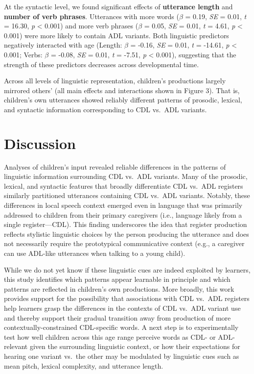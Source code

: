 \documentclass[10pt, letterpaper]{article}
\begin{document}
At the syntactic level, we found significant effects of
\textbf{utterance length} and \textbf{number of verb phrases}.
Utterances with more words (\(\beta\) = 0.19, \emph{SE} = 0.01, \emph{t}
= 16.30, \emph{p} \textless{} 0.001) and more verb phrases (\(\beta\) =
0.05, \emph{SE} = 0.01, \emph{t} = 4.61, \emph{p} \textless{} 0.001)
were more likely to contain ADL variants. Both linguistic predictors
negatively interacted with age (Length: \(\beta\) = -0.16, \emph{SE} =
0.01, \emph{t} = -14.61, \emph{p} \textless{} 0.001; Verbs: \(\beta\) =
-0.08, \emph{SE} = 0.01, \emph{t} = -7.51, \emph{p} \textless{} 0.001),
suggesting that the strength of these predictors decreases across
developmental time.

Across all levels of linguistic representation, children's productions
largely mirrored others' (all main effects and interactions shown in
Figure 3). That is, children's own utterances showed reliably different
patterns of prosodic, lexical, and syntactic information corresponding
to CDL vs.~ADL variants.

\hypertarget{discussion-1}{%
\section{Discussion}\label{discussion-1}}

Analyses of children's input revealed reliable differences in the
patterns of linguistic information surrounding CDL vs.~ADL variants.
Many of the prosodic, lexical, and syntactic features that broadly
differentiate CDL vs.~ADL registers similarly partitioned utterances
containing CDL vs.~ADL variants. Notably, these differences in local
speech context emerged even in language that was primarily addressed to
children from their primary caregivers (i.e., language likely from a
single register---CDL). This finding underscores the idea that register
production reflects stylistic linguistic choices by the person producing
the utterance and does not necessarily require the prototypical
communicative context (e.g., a caregiver can use ADL-like utterances
when talking to a young child).

While we do not yet know if these linguistic cues are indeed exploited
by learners, this study identifies which patterns appear learnable in
principle and which patterns are reflected in children's own
productions. More broadly, this work provides support for the
possibility that associations with CDL vs.~ADL registers help learners
grasp the differences in the contexts of CDL vs.~ADL variant use and
thereby support their gradual transition away from production of more
contextually-constrained CDL-specific words. A next step is to
experimentally test how well children across this age range perceive
words as CDL- or ADL-relevant given the surrounding linguistic context,
or how their expectations for hearing one variant vs.~the other may be
modulated by linguistic cues such as mean pitch, lexical complexity, and
utterance length.
\end{document}
